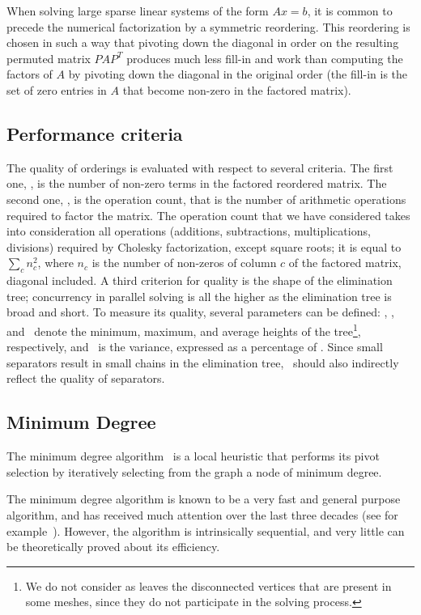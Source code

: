When solving large sparse linear systems of the form $Ax=b$, it is
common to precede the numerical factorization by a symmetric
reordering. This reordering is chosen in such a way that pivoting down
the diagonal in order on the resulting permuted matrix $PAP^T$
produces much less fill-in and work than computing the factors of $A$
by pivoting down the diagonal in the original order (the fill-in is
the set of zero entries in $A$ that become non-zero in the factored
matrix).

\subsection{Performance criteria}
\label{sec-order-perf}

The quality of orderings is evaluated with respect to several
criteria. The first one, \NNZ, is the number of non-zero terms in the
factored reordered matrix. The second one, \OPC, is the operation
count, that is the number of arithmetic operations required to factor
the matrix. The operation count that we have considered takes into
consideration all operations (additions, subtractions,
multiplications, divisions) required by Cholesky factorization, except
square roots; it is equal to $\sum_c n_c^2$, where $n_c$ is the number
of non-zeros of column $c$ of the factored matrix, diagonal included.
A third criterion for quality is the shape of the elimination tree;
concurrency in parallel solving is all the higher as the elimination tree is
broad and short. To measure its quality, several parameters can be defined:
\hmin, \hmax, and \havg\ denote the minimum, maximum, and average heights
of the tree\footnote%
{We do not consider as leaves the disconnected vertices that are present in
some meshes, since they do not participate in the solving process.},
respectively, and \hdlt\ is the variance, expressed as a percentage of \havg.
Since small separators result in small chains in the elimination tree,
\havg\ should also indirectly reflect the quality of separators.

\subsection{Minimum Degree}

The minimum degree algorithm~\cite{tiwa67} is
a local heuristic that performs its pivot selection by iteratively
selecting from the graph a node of minimum degree.

The minimum degree algorithm is known to be a very fast and general
purpose algorithm, and has received much attention over the last three
decades (see for example~\cite{amdadu96,geli89,liu-85}). However, the
algorithm is intrinsically sequential, and very little can be
theoretically proved about its efficiency.

